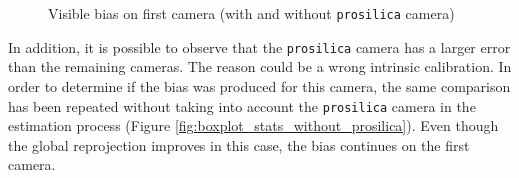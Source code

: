 \begin{figure}[!htbp]
 \centering
 \caption{Visible bias on first camera (with and without \texttt{prosilica} camera)}
\end{figure}

In addition, it is possible to observe that the \texttt{prosilica} camera has a larger error than the remaining cameras. The reason could be a wrong intrinsic calibration. In order to determine if the bias was produced for this camera, the same comparison has been repeated without taking into account the \texttt{prosilica} camera in the estimation process (Figure \ref{fig:boxplot_stats_without_prosilica}). Even though the global reprojection improves in this case, the bias continues on the first camera.




